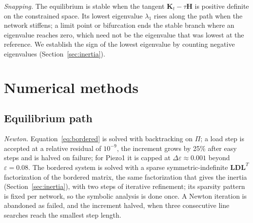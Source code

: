 \documentclass[preprint,12pt,a4paper]{elsarticle}
\newcommand{\Kt}{\mathbf{K}_t}
\newcommand{\Hm}{\mathbf{H}}
\newcommand{\eps}{\varepsilon}
\begin{document}
\emph{Snapping.} The equilibrium is stable when the tangent $\Kt-\tau\Hm$ is positive definite on the constrained space. Its lowest eigenvalue $\lambda_1$ rises along the path when the network stiffens; a limit point or bifurcation ends the stable branch where an eigenvalue reaches zero, which need not be the eigenvalue that was lowest at the reference. We establish the sign of the lowest eigenvalue by counting negative eigenvalues (Section~\ref{sec:inertia}).

\section{Numerical methods}
\label{sec:num}
\subsection{Equilibrium path}
\emph{Newton.} Equation~\eqref{eq:bordered} is solved with backtracking on $\Pi$; a load step is accepted at a relative residual of $10^{-9}$, the increment grows by 25\% after easy steps and is halved on failure; for Piezo1 it is capped at $\Delta\eps\approx0.001$ beyond $\eps=0.08$. The bordered system is solved with a sparse symmetric-indefinite $\mathbf{L}\mathbf{D}\mathbf{L}^T$ factorization of the bordered matrix, the same factorization that gives the inertia (Section~\ref{sec:inertia}), with two steps of iterative refinement; its sparsity pattern is fixed per network, so the symbolic analysis is done once. A Newton iteration is abandoned as failed, and the increment halved, when three consecutive line searches reach the smallest step length.
\end{document}
